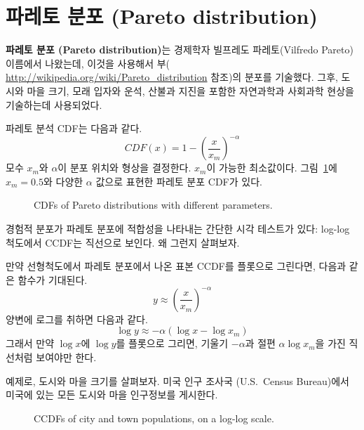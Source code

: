 \section{파레토 분포 (Pareto distribution)}

{\bf 파레토 분포 (Pareto distribution)}는 경제학자 빌프레도 파레토(Vilfredo Pareto) 이름에서 나왔는데, 이것을 사용해서 부(
\url{http://wikipedia.org/wiki/Pareto_distribution} 참조)의 분포를 기술했다.
그후, 도시와 마을 크기, 모래 입자와 운석, 산불과 지진을 포함한 자연과학과 사회과학 현상을 기술하는데 사용되었다.


파레토 분석 CDF는 다음과 같다.
%
\[ CDF(x) = 1 - \left( \frac{x}{x_m} \right) ^{-\alpha} \]
%
모수 $x_{m}$와 $\alpha$이 분포 위치와 형상을 결정한다.
$x_{m}$이 가능한 최소값이다. 
그림~\ref{analytic_pareto_cdf}에 $x_{m} = 0.5$와 
다양한 $\alpha$ 값으로 표현한 파레토 분포 CDF가 있다.

\begin{figure}
\caption{CDFs of Pareto distributions with different parameters.}
\label{analytic_pareto_cdf}
\end{figure}

경험적 분포가 파레토 분포에 적합성을 나타내는 간단한 시각 테스트가 있다: log-log 척도에서 CCDF는 직선으로 보인다. 왜 그런지 살펴보자.

만약 선형척도에서 파레토 분포에서 나온 표본 CCDF를 플롯으로 그린다면, 다음과 같은 함수가 기대된다.
%
\[ y \approx \left( \frac{x}{x_m} \right) ^{-\alpha} \]
%
양변에 로그를 취하면 다음과 같다.
%
\[ \log y \approx -\alpha (\log x - \log x_{m})\]
%
그래서 만약 $\log x$에 $\log y$를 플롯으로 그리면, 
기울기 $-\alpha$과 절편 $\alpha \log x_{m}$을 가진 직선처럼 보여야만 한다.

예제로, 도시와 마을 크기를 살펴보자.
미국 인구 조사국 (U.S.~Census Bureau)에서 미국에 있는 모든 도시와 마을 인구정보를 게시한다.

\begin{figure}
\caption{CCDFs of city and town populations, on a log-log scale.}
\label{populations_pareto}
\end{figure}

